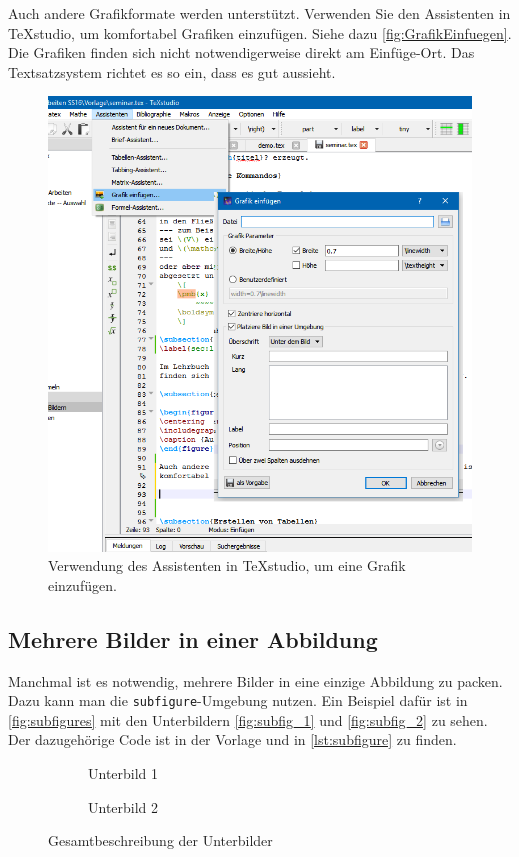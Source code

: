 Auch andere Grafikformate werden unterstützt. Verwenden Sie den Assistenten in TeXstudio, um komfortabel Grafiken einzufügen. Siehe dazu \autoref{fig:GrafikEinfuegen}. Die Grafiken finden sich nicht notwendigerweise direkt am Einfüge-Ort. Das Textsatzsystem richtet es so ein, dass es gut aussieht.

\begin{figure}
\centering
\includegraphics[width=0.7\linewidth]{bilder/GrafikEinfuegen}
\caption{Verwendung des Assistenten in \TeX studio, um eine Grafik einzufügen.}
\label{fig:GrafikEinfuegen}
\end{figure}

\subsection{Mehrere Bilder in einer Abbildung}

Manchmal ist es notwendig, mehrere Bilder in eine einzige Abbildung zu packen. Dazu kann man die \lstinline|subfigure|-Umgebung nutzen. Ein Beispiel dafür ist in \autoref{fig:subfigures} mit den Unterbildern \autoref{fig:subfig_1} und \autoref{fig:subfig_2} zu sehen. Der dazugehörige Code ist in der Vorlage und in \autoref{lst:subfigure} zu finden.

\begin{figure}
    \centering
    \begin{subfigure}{0.45\textwidth}
        \centering
        \caption{Unterbild 1}
        \label{fig:subfig_1}
    \end{subfigure}
    \hfill
    \begin{subfigure}{0.45\textwidth}
        \centering
        \caption{Unterbild 2}
        \label{fig:subfig_2}
    \end{subfigure}
    \caption{Gesamtbeschreibung der Unterbilder}
    \label{fig:subfigures}
\end{figure}

